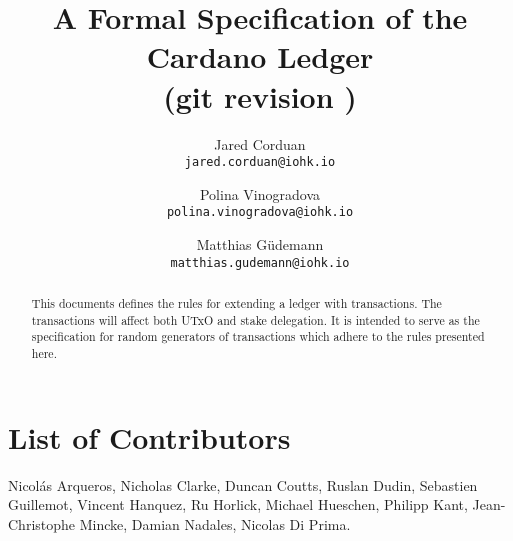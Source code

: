 
\title{A Formal Specification of the Cardano Ledger \\
       {\small (git revision \gitFirstTagDescribe)}}

\author{Jared Corduan  \\ {\small \texttt{jared.corduan@iohk.io}} \\
   \and Polina Vinogradova \\ {\small \texttt{polina.vinogradova@iohk.io}} \\
   \and Matthias G\"udemann  \\ {\small \texttt{matthias.gudemann@iohk.io}}}


\maketitle

\begin{abstract}
This documents defines the rules for extending a ledger with transactions.
The transactions will affect both UTxO and stake delegation.
It is intended to serve as the specification for random generators of transactions
which adhere to the rules presented here.
\end{abstract}

\section*{List of Contributors}
\label{acknowledgements}

Nicol\'as Arqueros,
Nicholas Clarke,
Duncan Coutts,
Ruslan Dudin,
Sebastien Guillemot,
Vincent Hanquez,
Ru Horlick,
Michael Hueschen,
Philipp Kant,
Jean-Christophe Mincke,
Damian Nadales,
Nicolas Di Prima.
